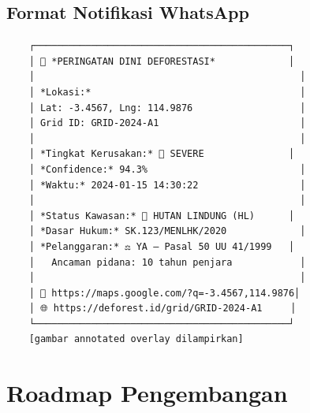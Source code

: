 \documentclass[11pt,a4paper]{article}
\begin{document}
\subsection{Format Notifikasi WhatsApp}

\begin{verbatim}
    ┌─────────────────────────────────────────────┐
    │ 🚨 *PERINGATAN DINI DEFORESTASI*             │
    │                                               │
    │ *Lokasi:*                                     │
    │ Lat: -3.4567, Lng: 114.9876                   │
    │ Grid ID: GRID-2024-A1                         │
    │                                               │
    │ *Tingkat Kerusakan:* 🔴 SEVERE               │
    │ *Confidence:* 94.3%                           │
    │ *Waktu:* 2024-01-15 14:30:22                  │
    │                                               │
    │ *Status Kawasan:* 🛑 HUTAN LINDUNG (HL)      │
    │ *Dasar Hukum:* SK.123/MENLHK/2020             │
    │ *Pelanggaran:* ⚖️ YA — Pasal 50 UU 41/1999   │
    │   Ancaman pidana: 10 tahun penjara            │
    │                                               │
    │ 📍 https://maps.google.com/?q=-3.4567,114.9876│
    │ 🌐 https://deforest.id/grid/GRID-2024-A1     │
    └─────────────────────────────────────────────┘
    [gambar annotated overlay dilampirkan]
\end{verbatim}

\section{Roadmap Pengembangan}
\end{document}
